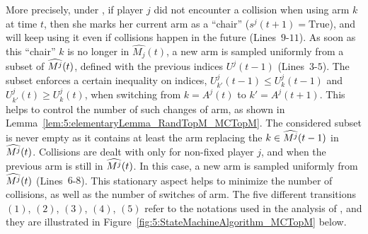 

More precisely, under \MCTopM,
if player $j$ did not encounter a collision when using arm $k$ at time $t$,
then she marks her current arm as a ``chair'' ($s^j(t+1)=\mathrm{True}$),
and will keep using it even if collisions happen in the future (Lines~$9$-$11$).
%
As soon as this ``chair'' $k$ is no longer in $\widehat{M_j}(t)$,
a new arm is sampled uniformly from a subset of $\widehat{M^j}(t)$,
defined with the previous indices $U^j(t-1)$ (Lines~$3$-$5$).
%
The subset enforces a certain inequality on indices,
$U_{k'}^j(t-1) \leq U^j_{k}(t-1)$ and $U_{k'}^j(t) \geq U^j_{k}(t)$,
when switching from $k=A^j(t)$ to $k'=A^j(t+1)$.
This helps to control the number of such changes of arm,
as shown in Lemma~\ref{lem:5:elementaryLemma_RandTopM_MCTopM}.
The considered subset is never empty as it contains
at least the arm replacing the $k\in\widehat{M^j}(t-1)$ in $\widehat{M^j}(t)$.
Collisions are dealt with only for non-fixed player $j$,
and when the previous arm is still in $\widehat{M^j}(t)$.
%
In this case, a new arm is sampled uniformly from $\widehat{M^j}(t)$ (Lines~$6$-$8$).
%
%
This stationary aspect helps to minimize the number of collisions,
as well as the number of switches of arm.
%
The five different transitions $(1)$, $(2)$, $(3)$, $(4)$, $(5)$ refer to the notations used in the analysis of \MCTopM, and they are illustrated in Figure~\ref{fig:5:StateMachineAlgorithm_MCTopM} below.


